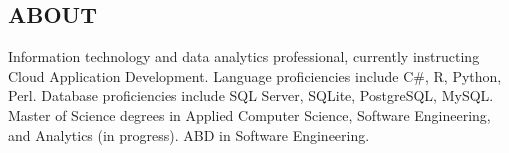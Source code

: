\documentclass[margin, 10pt]{res} %
\begin{document}
\begin{resume}

 
\section{ABOUT}  

    Information technology and data analytics professional, currently instructing Cloud Application Development. Language proficiencies include C\#, R, Python, Perl. Database proficiencies include SQL Server, SQLite, PostgreSQL, MySQL. Master of Science degrees in Applied Computer Science, Software Engineering, and Analytics (in progress). ABD in Software Engineering. 




\end{resume}
\end{document}
